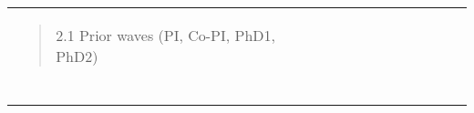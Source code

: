 \begin{longtable}[]{@{}lllllllllll@{}}
\begin{minipage}[t]{0.07\columnwidth}
\begin{quote}
2.1 Prior waves (PI, Co-PI, PhD1, PhD2) \end{quote}\strut \end{minipage} & \begin{minipage}[t]{0.07\columnwidth}\raggedright \strut \end{minipage} & \begin{minipage}[t]{0.07\columnwidth}\raggedright \strut \end{minipage} & \begin{minipage}[t]{0.07\columnwidth}\raggedright \strut \end{minipage} & \begin{minipage}[t]{0.07\columnwidth}\raggedright \strut \end{minipage} & \begin{minipage}[t]{0.07\columnwidth}\raggedright \strut \end{minipage} & \begin{minipage}[t]{0.07\columnwidth}\raggedright \strut \end{minipage} & \begin{minipage}[t]{0.07\columnwidth}\raggedright \strut \end{minipage} & \begin{minipage}[t]{0.07\columnwidth}\raggedright \strut \end{minipage} & \begin{minipage}[t]{0.07\columnwidth}\raggedright \strut \end{minipage} & \begin{minipage}[t]{0.07\columnwidth}\raggedright \strut \end{minipage}\tabularnewline \begin{minipage}[t]{0.07\columnwidth}\raggedright \begin{quote}

\end{quote}
\end{minipage}
\end{longtable}
